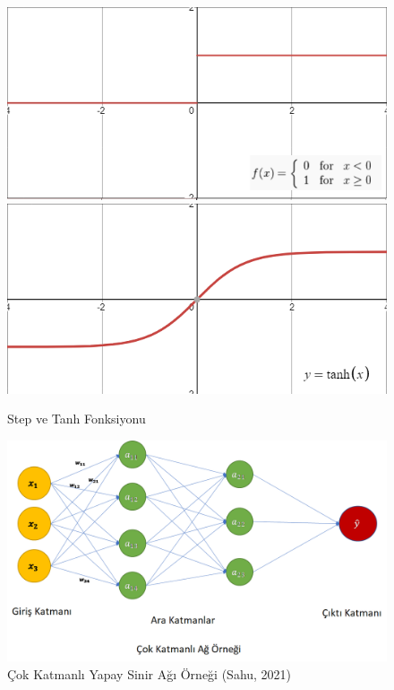 \documentclass[12pt,twoside]{deuthesis}
\begin{document}
\begin{figure}

{\centering \includegraphics[width=0.49\linewidth,height=0.18\textheight]{figure/step} \includegraphics[width=0.49\linewidth,height=0.18\textheight]{figure/tanh} 

}

\caption{Step ve Tanh Fonksiyonu }\label{fig:unnamed-chunk-12}
\end{figure}
\begin{figure}

{\centering \includegraphics[width=1\linewidth,height=0.3\textheight]{figure/cok_katmanli} 

}

\caption{Çok Katmanlı Yapay Sinir Ağı Örneği (Sahu, 2021)}\label{fig:unnamed-chunk-13}
\end{figure}
~
~
\end{document}
